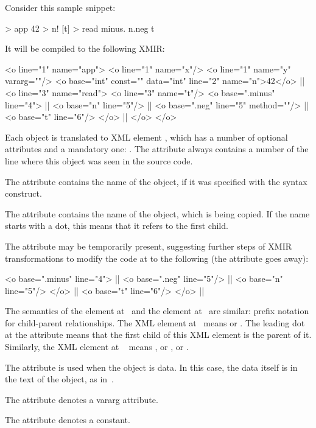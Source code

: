 Consider this sample \eo{} snippet:

\begin{ffcode}
[x y...] > app
  42 > n!
  [t] > read
    minus.
      n.neg
      t
\end{ffcode}

It will be compiled to the following XMIR:

\begin{ffcode}
<o line="1" name="app">
  <o line="1" name="x"/>
  <o line="1" name="y" vararg=""/>
  <o base="int" const="" data="int"
    line="2" name="n">42</o>   |$\label{ln:xml-data}$|
  <o line="3" name="read">
    <o line="3" name="t"/>
    <o base=".minus" line="4"> |$\label{ln:xml-minus}$|
      <o base="n" line="5"/> |$\label{ln:method-start}$|
      <o base=".neg" line="5" method=""/>  |$\label{ln:method-end}$|
      <o base="t" line="6"/>
    </o> |$\label{ln:xml-minus-end}$|
  </o>
</o>
\end{ffcode}

Each object is translated to XML element , which has
a number of optional attributes and a mandatory one: .
The attribute  always contains a number of the
line where this object was seen in the source code.

The attribute  contains the name of the object, if
it was specified with the \ff{>} syntax construct.

The attribute  contains the name of the object, which
is being copied. If the name starts with a dot, this means
that it refers to the first  child.

The attribute  may be temporarily present, suggesting
further steps of XMIR transformations to modify the code
at  to the following (the attribute 
goes away):

\begin{ffcode}
<o base=".minus" line="4"> |$\label{ln:new-minus}$|
  <o base=".neg" line="5"/> |$\label{ln:xml-neg}$|
    <o base="n" line="5"/>
  </o> |$\label{ln:xml-neg-end}$|
  <o base="t" line="6"/>
</o> |$\label{ln:new-minus-end}$|
\end{ffcode}

The semantics of the element  at~
and the element  at~ are similar: prefix
notation for child-parent relationships. The XML element at~
means  or . The
leading dot at the attribute  means that the first
child of this XML element is the \eo{} parent of it.
Similarly, the XML element at ~
means , or , or .

The attribute  is used when the object is data. In this
case, the data itself is in the text of the object, as in~.

The attribute  denotes a vararg attribute.

The attribute  denotes a constant.
